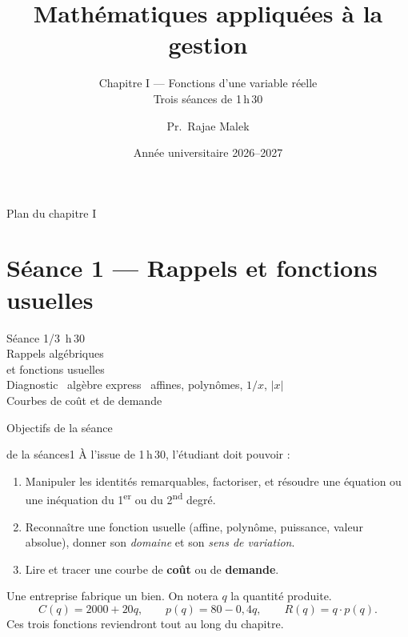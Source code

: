 \documentclass[10pt,aspectratio=169]{beamer}
\title[Chapitre I --- Fonctions]{Mathématiques appliquées à la gestion}
\subtitle{
Chapitre I --- Fonctions d'une variable réelle\\[0.35em]
Trois séances de 1\,h\,30
}
\author[Pr.\ Rajae Malek]{Pr.\ Rajae Malek}
\institute[]{
    Business School, Université Mundiapolis\\
    Honoris Universities
}
\date{Année universitaire 2026--2027}
\numberwithin{dummy}{section}
\newcommand{\CT}{C}
\newcommand{\Rec}{R}
\begin{document}
\maketitle
\usebackgroundtemplate{}

\begin{frame}{Plan du chapitre I}
    \tableofcontents
\end{frame}

\part{Séance 1 --- Rappels et fonctions usuelles}

\begin{frame}[plain]
\centering
\vspace{1.6cm}
{\Large Séance 1/3 \quad\textemdash{}\,h\,30}\\[0.8em]
{ Rappels algébriques\\[0.2em] et fonctions usuelles}\\[1.2em]
{\large Diagnostic \textbullet\ algèbre express \textbullet\ affines, polynômes, $1/x$, $|x|$}\\[0.4em]
{\large Courbes de coût et de demande}
\end{frame}


\begin{frame}{Objectifs de la séance}
\begin{myobj}{de la séance}{s1}
À l'issue de 1\,h\,30, l'étudiant doit pouvoir :
\end{myobj}
\vspace{-0.4em}
\begin{enumerate}
    \item Manipuler les identités remarquables, factoriser, et résoudre une équation ou une inéquation du 1\textsuperscript{er} ou du 2\textsuperscript{nd} degré.
    \item Reconnaître une fonction usuelle (affine, polynôme, puissance, valeur absolue), donner son \emph{domaine} et son \emph{sens de variation}.
    \item Lire et tracer une courbe de \textbf{coût} ou de \textbf{demande}.
\end{enumerate}

\vspace{0.4em}
\begin{boxgestion}
Une entreprise fabrique un bien. On notera $q$ la quantité produite.
\[
\CT(q)=2000+20q,\qquad
p(q)=80-0{,}4q,\qquad
\Rec(q)=q\cdot p(q).
\]
Ces trois fonctions reviendront tout au long du chapitre.
\end{boxgestion}
\end{frame}
\end{document}
